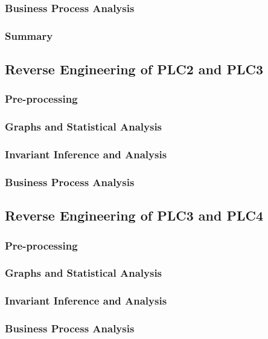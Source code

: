 \subsubsection{Business Process Analysis}
\label{subsubsec:6_P1P2_bpa}

\subsubsection{Summary}
\label{subsubsec:6_P1P2_summary_table}


\subsection{Reverse Engineering of PLC2 and PLC3}
\label{subsec:6_P2P3_analysis}

\subsubsection{Pre-processing}
\label{subsubsec:6_P2P3_preprocessing}

\subsubsection{Graphs and Statistical Analysis}
\label{subsubsec:6_P2P3_graphs}

\subsubsection{Invariant Inference and Analysis}
\label{subsubsec:6_P2P3_invariants}

\subsubsection{Business Process Analysis}
\label{subsubsec:6_P2P3_bpa}

\subsection{Reverse Engineering of PLC3 and PLC4}
\label{subsec:6_P3P4_analysis}

\subsubsection{Pre-processing}
\label{subsubsec:6_P3P4_preprocessing}

\subsubsection{Graphs and Statistical Analysis}
\label{subsubsec:6_P3P4_graphs}

\subsubsection{Invariant Inference and Analysis}
\label{subsubsec:6_P3P4_invariants}

\subsubsection{Business Process Analysis}
\label{subsubsec:6_P3P4_bpa}

\vfill
\nolinenumbers